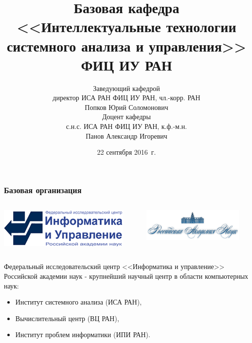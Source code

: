 \documentclass[default]{beamer}
\begin{document}
	
	\title[ИТСАУ ФИЦ ИУ РАН]{Базовая кафедра <<Интеллектуальные технологии системного анализа и управления>> ФИЦ ИУ РАН}
	\author[Попков Ю.С., Панов А.И.]{Заведующий кафедрой\\директор ИСА РАН ФИЦ ИУ РАН, чл.-корр. РАН\\Попков Юрий Соломонович\\ Доцент кафедры\\с.н.с. ИСА РАН ФИЦ ИУ РАН, к.ф.-м.н.\\Панов Александр Игоревич}

	\date{22 сентября 2016~г.} 
	
	\begin{frame}
		\titlepage
	\end{frame}

	\begin{frame}
		\frametitle{Базовая организация}
		\begin{columns}
			\begin{column}{0.5\textwidth}
				\centering
				\includegraphics[width=0.9\textwidth]{misc/logos/frccsc}
			\end{column}
			\begin{column}{0.5\textwidth}
				\centering
				\includegraphics[width=0.9\textwidth]{misc/logos/ras}
			\end{column}
		\end{columns}
		\par\bigskip
		\par\bigskip
		Федеральный исследовательский центр <<Информатика и управление>> Российской академии наук - крупнейший научный центр в области компьютерных наук:
		\begin{itemize}
			\item Институт системного анализа (ИСА РАН),
			\item Вычислительный центр (ВЦ РАН),
			\item Институт проблем информатики (ИПИ РАН).
		\end{itemize}
	\end{frame}
	
\end{document}
